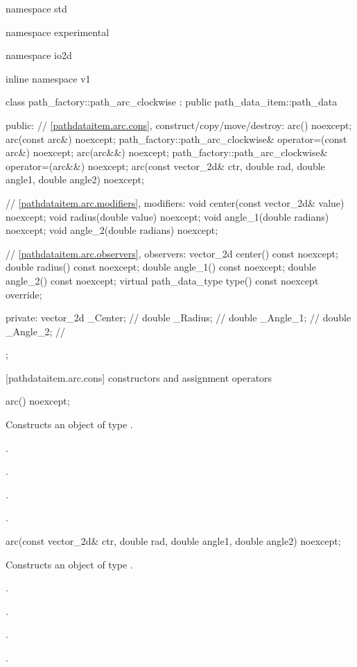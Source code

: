\begin{codeblock}
namespace std { namespace experimental { namespace io2d { inline namespace v1 {
  class path_factory::path_arc_clockwise : public path_data_item::path_data {
  public:
    // \ref{pathdataitem.arc.cons}, construct/copy/move/destroy:
    arc() noexcept;
    arc(const arc&) noexcept;
    path_factory::path_arc_clockwise& operator=(const arc&) noexcept;
    arc(arc&&) noexcept;
    path_factory::path_arc_clockwise& operator=(arc&&) noexcept;
    arc(const vector_2d& ctr, double rad, double angle1, double angle2) noexcept;

    // \ref{pathdataitem.arc.modifiers}, modifiers:
    void center(const vector_2d& value) noexcept;
    void radius(double value) noexcept;
    void angle_1(double radians) noexcept;
    void angle_2(double radians) noexcept;

    // \ref{pathdataitem.arc.observers}, observers:
    vector_2d center() const noexcept;
    double radius() const noexcept;
    double angle_1() const noexcept;
    double angle_2() const noexcept;
    virtual path_data_type type() const noexcept override;

  private:
    vector_2d _Center; // \expos
    double _Radius;    // \expos
    double _Angle_1;   // \expos
    double _Angle_2;   // \expos
  };
} } } }
\end{codeblock}

 [pathdataitem.arc.cons] { constructors and assignment operators}

\begin{itemdecl}
    arc() noexcept;
\end{itemdecl}
\begin{itemdescr}
	\pnum
	\effects
	Constructs an object of type .
	
	\pnum
	\postconditions
	.

	.

	.

	.
\end{itemdescr}

\begin{itemdecl}
    arc(const vector_2d& ctr, double rad, double angle1, double angle2) noexcept;
\end{itemdecl}
\begin{itemdescr}
	\pnum
	\effects
	Constructs an object of type .
	
	\pnum
	\postconditions
	.

	.

	.

	.
\end{itemdescr}

